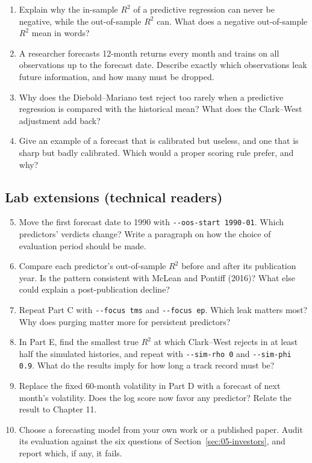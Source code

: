 \begin{enumerate}
  \item Explain why the in-sample $R^2$ of a predictive regression can never be negative, while the out-of-sample $R^2$ can. What does a negative out-of-sample $R^2$ mean in words?
  \item A researcher forecasts 12-month returns every month and trains on all observations up to the forecast date. Describe exactly which observations leak future information, and how many must be dropped.
  \item Why does the Diebold--Mariano test reject too rarely when a predictive regression is compared with the historical mean? What does the Clark--West adjustment add back?
  \item Give an example of a forecast that is calibrated but useless, and one that is sharp but badly calibrated. Which would a proper scoring rule prefer, and why?
\end{enumerate}

\subsection*{Lab extensions (technical readers)}

\begin{enumerate}
  \setcounter{enumi}{4}
  \item Move the first forecast date to 1990 with \texttt{-{}-oos-start 1990-01}. Which predictors' verdicts change? Write a paragraph on how the choice of evaluation period should be made.
  \item Compare each predictor's out-of-sample $R^2$ before and after its publication year. Is the pattern consistent with McLean and Pontiff (2016)? What else could explain a post-publication decline?
  \item Repeat Part C with \texttt{-{}-focus tms} and \texttt{-{}-focus ep}. Which leak matters most? Why does purging matter more for persistent predictors?
  \item In Part E, find the smallest true $R^2$ at which Clark--West rejects in at least half the simulated histories, and repeat with \texttt{-{}-sim-rho 0} and \texttt{-{}-sim-phi 0.9}. What do the results imply for how long a track record must be?
  \item Replace the fixed 60-month volatility in Part D with a forecast of next month's volatility. Does the log score now favor any predictor? Relate the result to Chapter 11.
  \item Choose a forecasting model from your own work or a published paper. Audit its evaluation against the six questions of Section~\ref{sec:05-investors}, and report which, if any, it fails.
\end{enumerate}

